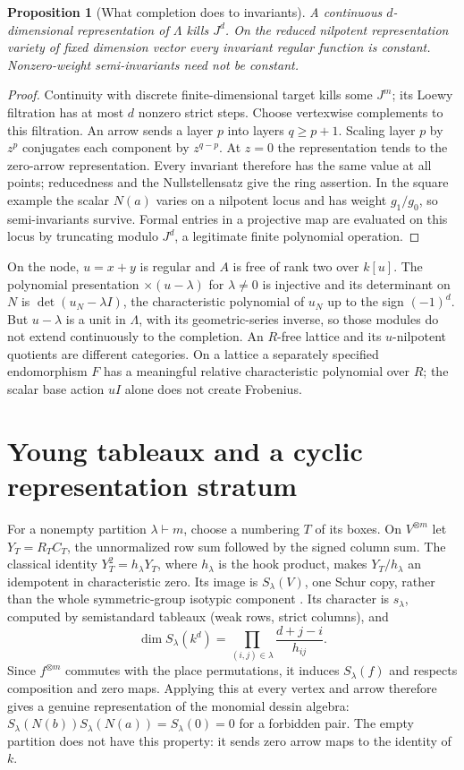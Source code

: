 \documentclass[11pt,oneside,openany]{book}
\newtheorem{proposition}[theorem]{Proposition}
\theoremstyle{definition}\newtheorem{definition}[theorem]{Definition}
\theoremstyle{remark}\newtheorem{remark}[theorem]{Remark}
\begin{document}
\begin{proposition}[What completion does to invariants]\label{thm:nilpotent}
A continuous $d$-dimensional representation of $\Lambda$ kills $J^d$. On the reduced nilpotent representation variety of fixed dimension vector every invariant regular function is constant. Nonzero-weight semi-invariants need not be constant.
\end{proposition}
\begin{proof}
Continuity with discrete finite-dimensional target kills some $J^m$; its Loewy filtration has at most $d$ nonzero strict steps. Choose vertexwise complements to this filtration. An arrow sends a layer $p$ into layers $q\ge p+1$. Scaling layer $p$ by $z^p$ conjugates each component by $z^{q-p}$. At $z=0$ the representation tends to the zero-arrow representation. Every invariant therefore has the same value at all points; reducedness and the Nullstellensatz give the ring assertion. In the square example the scalar $N(a)$ varies on a nilpotent locus and has weight $g_1/g_0$, so semi-invariants survive. Formal entries in a projective map are evaluated on this locus by truncating modulo $J^d$, a legitimate finite polynomial operation.
\end{proof}
On the node, $u=x+y$ is regular and $A$ is free of rank two over $k[u]$. The polynomial presentation $\times(u-\lambda)$ for $\lambda\ne0$ is injective and its determinant on $N$ is $\det(u_N-\lambda I)$, the characteristic polynomial of $u_N$ up to the sign $(-1)^d$. But $u-\lambda$ is a unit in $\Lambda$, with its geometric-series inverse, so those modules do not extend continuously to the completion. An $R$-free lattice and its $u$-nilpotent quotients are different categories. On a lattice a separately specified endomorphism $F$ has a meaningful relative characteristic polynomial over $R$; the scalar base action $uI$ alone does not create Frobenius.

\section{Young tableaux and a cyclic representation stratum}
For a nonempty partition $\lambda\vdash m$, choose a numbering $T$ of its boxes. On $V^{\otimes m}$ let $Y_T=R_TC_T$, the unnormalized row sum followed by the signed column sum. The classical identity $Y_T^2=h_\lambda Y_T$, where $h_\lambda$ is the hook product, makes $Y_T/h_\lambda$ an idempotent in characteristic zero. Its image is $S_\lambda(V)$, one Schur copy, rather than the whole symmetric-group isotypic component \cite{Etingof,SchurComplexes}. Its character is $s_\lambda$, computed by semistandard tableaux (weak rows, strict columns), and
\[
 \dim S_\lambda(k^d)=\prod_{(i,j)\in\lambda}\frac{d+j-i}{h_{ij}}.
\]
Since $f^{\otimes m}$ commutes with the place permutations, it induces $S_\lambda(f)$ and respects composition and zero maps. Applying this at every vertex and arrow therefore gives a genuine representation of the monomial dessin algebra: $S_\lambda(N(b))S_\lambda(N(a))=S_\lambda(0)=0$ for a forbidden pair. The empty partition does not have this property: it sends zero arrow maps to the identity of $k$.
\end{document}
